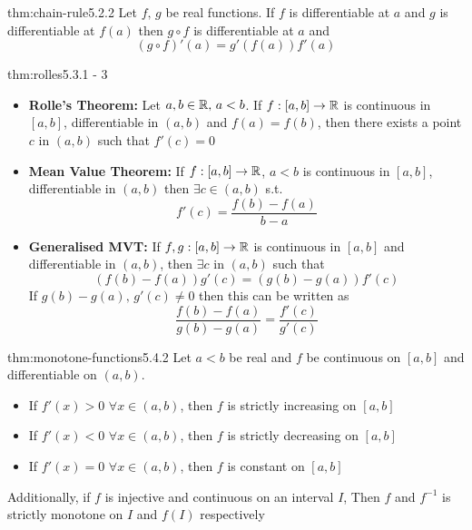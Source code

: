\documentclass[landscape, 8pt]{extarticle}
\begin{document}
\begin{multicols}{3}

\begin{thm}{thm:chain-rule}{5.2.2}
    Let $f,\,g$ be real functions. If $f$ is differentiable at $a$ and $g$ is differentiable at $f(a)$ then $g\circ f$ is differentiable at $a$ and
    \[(g\circ f)'(a) = g'(f(a))f'(a)\]
\end{thm}
\vspace{-8pt}

\begin{thm}{thm:rolles}{5.3.1 - 3}
    \renewcommand\labelitemi{\tiny$\bullet$}
    \begin{itemize}
        \setlength\itemsep{0em}
        \item \textbf{Rolle's Theorem:} Let $a,b\in \mathbb{R},\,a<b$. If $f:[a,b] \to \mathbb{R}$ is continuous in $[a,b]$, differentiable in $(a,b)$ and $f(a)=f(b)$, then there exists a point $c$ in $(a,b)$ such that $f'(c)=0$
        \item \textbf{Mean Value Theorem:} If $f:[a,b]\to\mathbb{R}$, $a<b$ is continuous in $[a,b]$, differentiable in $(a,b)$ then $\exists c\in (a,b)$ s.t.
        \[f'(c)=\frac{f(b)-f(a)}{b-a}\]
        \item \textbf{Generalised MVT:} If $f,g:[a,b]\to\mathbb{R}$ is continuous in $[a,b]$ and differentiable in $(a,b)$, then $\exists c$ in $(a,b)$ such that
        \[(f(b)-f(a))g'(c)=(g(b)-g(a))f'(c)\]
        If $g(b)-g(a),\,g'(c)\ne 0$ then this can be written as
        \[\frac{f(b)-f(a)}{g(b)-g(a)}= \frac{f'(c)}{g'(c)}\]
    \end{itemize}
\end{thm}
\vspace{-8pt}

\begin{thm}{thm:monotone-functions}{5.4.2}
Let $a<b$ be real and $f$ be continuous on $[a,b]$ and differentiable on $(a,b)$.
\renewcommand\labelitemi{\tiny$\bullet$}
\begin{itemize}
    \setlength\itemsep{0em}
    \item If $f'(x) > 0\,\, \forall x\in (a,b)$, then $f$ is strictly increasing on $[a,b]$
    \item If $f'(x) < 0\,\, \forall x\in (a,b)$, then $f$ is strictly decreasing on $[a,b]$
    \item If $f'(x) = 0\,\, \forall x\in(a,b)$, then $f$ is constant on $[a,b]$
\end{itemize}
Additionally, if $f$ is injective and continuous on an interval $I$, Then $f$ and $f^{-1}$ is strictly monotone on $I$ and $f(I)$ respectively
\end{thm}
\vspace{-8pt}


\end{multicols}
\end{document}
